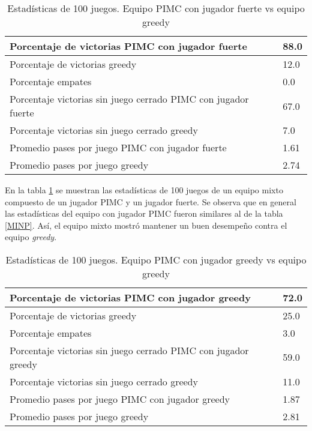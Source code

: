 \begin{table}[!ht]
    \centering
    \small
    \caption{Estadísticas de 100 juegos. Equipo PIMC con jugador fuerte vs equipo greedy}
    \begin{tabular}{|l|l|}
        \hline
        Porcentaje de victorias PIMC con jugador fuerte                & 88.0 \\ \hline
        Porcentaje de victorias greedy                                 & 12.0 \\ \hline
        Porcentaje empates                                             & 0.0  \\ \hline
        Porcentaje victorias sin juego cerrado PIMC con jugador fuerte & 67.0 \\ \hline
        Porcentaje victorias sin juego cerrado greedy                  & 7.0  \\ \hline
        Promedio pases por juego PIMC con jugador fuerte               & 1.61 \\ \hline
        Promedio pases por juego greedy                                & 2.74 \\ \hline
    \end{tabular}
    \label{MIXS}
\end{table}

En la tabla \ref{MIXS} se muestran las estadísticas de 100 juegos de un equipo
mixto compuesto de un jugador PIMC y un jugador fuerte. Se observa que en
general las estadísticas del equipo con jugador PIMC fueron similares al de la
tabla \ref{MINP}. Así, el equipo mixto mostró mantener un buen desempeño contra
el equipo \textit{greedy}.


\begin{table}[!ht]
    \centering
    \small
    \caption{Estadísticas de 100 juegos. Equipo PIMC con jugador greedy vs equipo greedy}
    \begin{tabular}{|l|l|}
        \hline
        Porcentaje de victorias PIMC con jugador greedy                & 72.0 \\ \hline
        Porcentaje de victorias greedy                                 & 25.0 \\ \hline
        Porcentaje empates                                             & 3.0  \\ \hline
        Porcentaje victorias sin juego cerrado PIMC con jugador greedy & 59.0 \\ \hline
        Porcentaje victorias sin juego cerrado greedy                  & 11.0 \\ \hline
        Promedio pases por juego PIMC con jugador greedy               & 1.87 \\ \hline
        Promedio pases por juego greedy                                & 2.81 \\ \hline
    \end{tabular}
    \label{MIXG}
\end{table}

